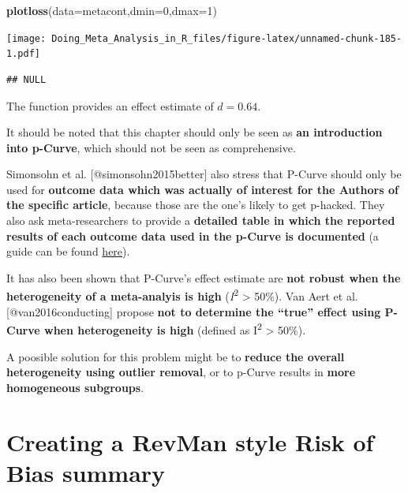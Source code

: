 \documentclass[]{book}
\newenvironment{Shaded}{\begin{snugshade}}{\end{snugshade}}
\newcommand{\DataTypeTok}[1]{\textcolor[rgb]{0.13,0.29,0.53}{#1}}
\newcommand{\DecValTok}[1]{\textcolor[rgb]{0.00,0.00,0.81}{#1}}
\newcommand{\KeywordTok}[1]{\textcolor[rgb]{0.13,0.29,0.53}{\textbf{#1}}}
\newcommand{\NormalTok}[1]{#1}
\begin{document}
\begin{Shaded}
\begin{Highlighting}[]
\KeywordTok{plotloss}\NormalTok{(}\DataTypeTok{data=}\NormalTok{metacont,}\DataTypeTok{dmin=}\DecValTok{0}\NormalTok{,}\DataTypeTok{dmax=}\DecValTok{1}\NormalTok{)}
\end{Highlighting}
\end{Shaded}

\texttt{[image: Doing\_Meta\_Analysis\_in\_R\_files/figure-latex/unnamed-chunk-185-1.pdf]}

\begin{verbatim}
## NULL
\end{verbatim}

The function provides an effect estimate of \(d=0.64\).

\begin{rmdachtung}
It should be noted that this chapter should only be seen as \textbf{an
introduction into p-Curve}, which should not be seen as comprehensive.

Simonsohn et al. {[}@simonsohn2015better{]} also stress that P-Curve
should only be used for \textbf{outcome data which was actually of
interest for the Authors of the specific article}, because those are the
one's likely to get p-hacked. They also ask meta-researchers to provide
a \textbf{detailed table in which the reported results of each outcome
data used in the p-Curve is documented} (a guide can be found
\href{http://p-curve.com/guide.pdf}{here}).

It has also been shown that P-Curve's effect estimate are \textbf{not
robust when the heterogeneity of a meta-analyis is high}
(\emph{I}\textsuperscript{2} \textgreater{} 50\%). Van Aert et al.
{[}@van2016conducting{]} propose \textbf{not to determine the ``true''
effect using P-Curve when heterogeneity is high} (defined as
I\textsuperscript{2} \textgreater{} 50\%).

A poosible solution for this problem might be to \textbf{reduce the
overall heterogeneity using outlier removal}, or to p-Curve results in
\textbf{more homogeneous subgroups}.
\end{rmdachtung}

\hypertarget{creating-a-revman-style-risk-of-bias-summary}{%
\chapter{Creating a RevMan style Risk of Bias summary}\label{creating-a-revman-style-risk-of-bias-summary}}
\end{document}
